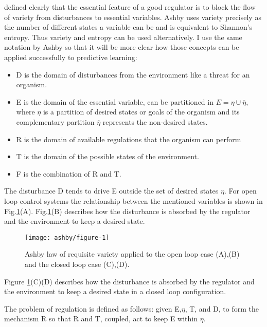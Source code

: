 \citet{Ashby1956:IntroCybernetics} defined clearly that the
 essential feature of a good regulator is to block the flow of variety from
disturbances to essential variables. Ashby uses variety precisely as the number
 of different states a variable can be and is equivalent to Shannon's entropy.
Thus variety and entropy can be used alternatively.
I use the same notation by Ashby so that it will be more clear how those concepts
can be applied successfully to predictive learning:
\begin{itemize}
 \item D is the domain of disturbances from the environment like a threat for an organism.
 \item E is the domain of the essential variable, can be partitioned in
$E= \eta \cup \overline{\eta}$, where $\eta$ is a partition of desired states
 or goals of the organism and its complementary partition $\overline{\eta}$
 represents the non-desired states.
 \item R is the domain of available regulations that the organism can perform
 \item T is the domain of the possible states of the environment.
 \item F is the combination of R and T.
\end{itemize}
The disturbance D tends to drive E outside the set of desired states $\eta$.
For open loop control systems the relationship between the mentioned variables 
is shown in Fig.\ref{fig:infotheory:ashby-model}(A).
Fig.\ref{fig:infotheory:ashby-model}(B) describes how the disturbance is absorbed by the regulator
 and the environment to keep a desired state.
\begin{figure}[!htbp]
\begin{center}
 \texttt{[image: ashby/figure-1]}
\caption[Ashby requisite variety]{Ashby law of requisite variety applied 
to the open loop case (A),(B) and the closed loop case (C),(D).
\label{fig:infotheory:ashby-model}
}
\end{center}
\end{figure}

Figure \ref{fig:infotheory:ashby-model}(C)(D) describes how the disturbance is absorbed by the regulator
 and the environment to keep a desired state in a closed loop configuration.

The problem of regulation is defined as follows: 
given E,$\eta$, T, and D, to form the mechanism R so that R and T, coupled, 
act to keep E within $\eta$.

